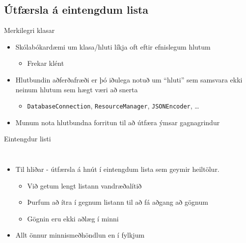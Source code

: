 \documentclass{beamer}
\begin{document}
\subsection{Útfærsla á eintengdum lista}

\begin{frame}{Merkilegri klasar}
    \begin{itemize}
        \item Skólabókardæmi um klasa/hluti líkja oft eftir efnislegum hlutum
        \begin{itemize}
            \item Frekar klént
        \end{itemize}
        \item Hlutbundin aðferðafræði er þó iðulega notuð um ``hluti'' sem samsvara ekki neinum hlutum sem hægt væri að snerta
        \begin{itemize}
            \item \texttt{DatabaseConnection}, \texttt{ResourceManager}, \texttt{JSONEncoder}, \ldots
        \end{itemize}
        \item Munum nota hlutbundna forritun til að útfæra ýmsar gagnagrindur
    \end{itemize}
\end{frame}

\begin{frame}[fragile]{Eintengdur listi}
    \begin{columns}
        \begin{itemize}
            \item Til hliðar - útfærsla á hnút í eintengdum lista sem geymir heiltölur.
            \begin{itemize}
                \item Við getum lengt listann vandræðalítið
                \item Þurfum að ítra í gegnum listann til að fá aðgang að gögnum
                \item Gögnin eru ekki aðlæg í minni
            \end{itemize}
            \item Allt önnur minnismeðhöndlun en í fylkjum
        \end{itemize} 
    \end{columns}
\end{frame}
\end{document}
